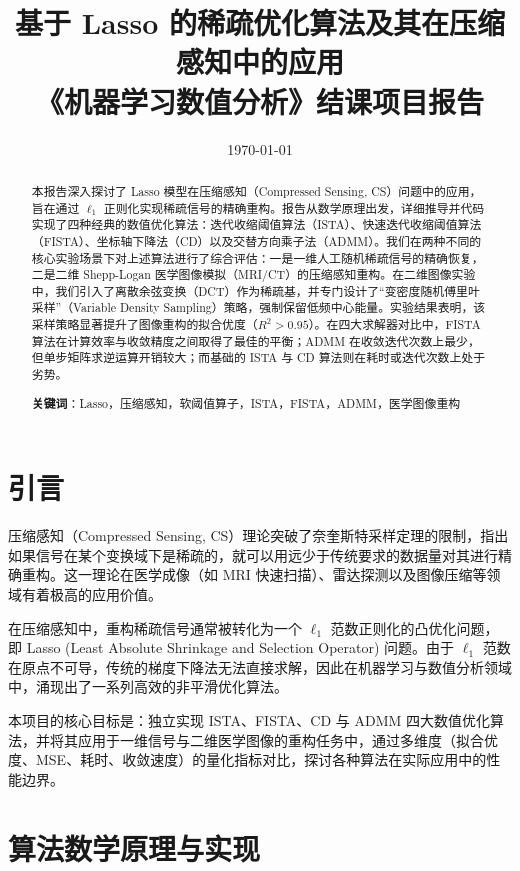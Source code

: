\documentclass[12pt, a4paper]{ctexart}
\title{\textbf{基于 Lasso 的稀疏优化算法及其在压缩感知中的应用}\\ 
\large 《机器学习数值分析》结课项目报告}
\author{}
\date{\today}
\begin{document}
\maketitle

\begin{abstract}
本报告深入探讨了 Lasso 模型在压缩感知（Compressed Sensing, CS）问题中的应用，旨在通过 $\ell_1$ 正则化实现稀疏信号的精确重构。报告从数学原理出发，详细推导并代码实现了四种经典的数值优化算法：迭代收缩阈值算法（ISTA）、快速迭代收缩阈值算法（FISTA）、坐标轴下降法（CD）以及交替方向乘子法（ADMM）。我们在两种不同的核心实验场景下对上述算法进行了综合评估：一是一维人工随机稀疏信号的精确恢复，二是二维 Shepp-Logan 医学图像模拟（MRI/CT）的压缩感知重构。在二维图像实验中，我们引入了离散余弦变换（DCT）作为稀疏基，并专门设计了“变密度随机傅里叶采样”（Variable Density Sampling）策略，强制保留低频中心能量。实验结果表明，该采样策略显著提升了图像重构的拟合优度（$R^2 > 0.95$）。在四大求解器对比中，FISTA 算法在计算效率与收敛精度之间取得了最佳的平衡；ADMM 在收敛迭代次数上最少，但单步矩阵求逆运算开销较大；而基础的 ISTA 与 CD 算法则在耗时或迭代次数上处于劣势。

\textbf{关键词}：Lasso，压缩感知，软阈值算子，ISTA，FISTA，ADMM，医学图像重构
\end{abstract}

\newpage

\section{引言}
压缩感知（Compressed Sensing, CS）理论突破了奈奎斯特采样定理的限制，指出如果信号在某个变换域下是稀疏的，就可以用远少于传统要求的数据量对其进行精确重构。这一理论在医学成像（如 MRI 快速扫描）、雷达探测以及图像压缩等领域有着极高的应用价值。

在压缩感知中，重构稀疏信号通常被转化为一个 $\ell_1$ 范数正则化的凸优化问题，即 Lasso (Least Absolute Shrinkage and Selection Operator) 问题。由于 $\ell_1$ 范数在原点不可导，传统的梯度下降法无法直接求解，因此在机器学习与数值分析领域中，涌现出了一系列高效的非平滑优化算法。

本项目的核心目标是：独立实现 ISTA、FISTA、CD 与 ADMM 四大数值优化算法，并将其应用于一维信号与二维医学图像的重构任务中，通过多维度（拟合优度、MSE、耗时、收敛速度）的量化指标对比，探讨各种算法在实际应用中的性能边界。

\section{算法数学原理与实现}
\end{document}

